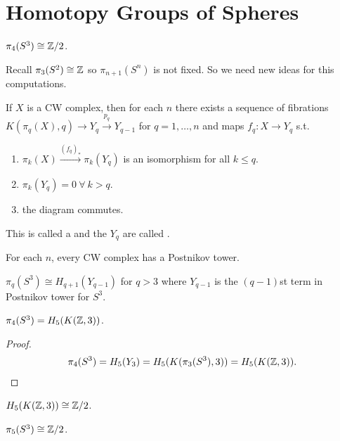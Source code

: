 \documentclass[12pt,class=article,crop=false]{standalone}
\begin{document}
\section{Homotopy Groups of Spheres}
\begin{thm}
$ \pi_4(S^3) \cong \mathbb{Z} /2$.
\end{thm}
\begin{remark}
Recall $ \pi_3(S^2) \cong \mathbb{Z}$ so $ \pi_{n+1}(S^{n})$ is not fixed. So we need new ideas for this computations.
\end{remark}

\begin{defn}

If $ X$ is a CW complex, then for each $ n$ there exists a sequence of fibrations  $ K(\pi_q(X),q) \to Y_q \xrightarrow{ p_q}  Y_{q-1}$ for $ q=1,\ldots,n$ and maps $f_q: X \to Y_q $ s.t.\ 
\begin{enumerate}[label=(\arabic*)]
	\item $ \pi_k(X) \xrightarrow{ (f_q)_*} \pi_k(Y_q) $ is an isomorphism for all $ k\leq q$.
	\item  $ \pi_k(Y_q) = 0 \ \forall \ k > q$.
	\item the diagram commutes.
\end{enumerate}
This is called a  and the $ Y_q$ are called  .  
\end{defn}
\begin{lem}
For each $ n$, every CW complex has a Postnikov tower.
\end{lem}

\begin{lem}
$ \pi_q(S^3) \cong H_{q+1}(Y_{q-1})$ for $ q > 3$ where  $ Y_{q-1}$ is the $ (q-1)$st term in Postnikov tower for $ S^3$.
\end{lem}

\begin{coro}
$ \pi_4(S^3) = H_5(K(\mathbb{Z},3))$.
\end{coro}
\begin{proof}
\begin{align*}
	\pi_4(S^3) = H_5(Y_3) = H_5(K(\pi_3(S^3),3)) = H_5(K(\mathbb{Z},3)).
\end{align*}
\end{proof}

\begin{thm}
$ H_5(K(\mathbb{Z},3)) \cong \mathbb{Z} /2$.
\end{thm}
\begin{thm}
$ \pi_5(S^3) \cong \mathbb{Z} /2$.
\end{thm}
\end{document}

